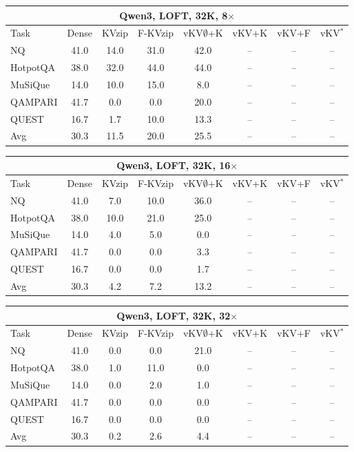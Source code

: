 \begin{tabular}{lccccccc}
\toprule
\multicolumn{8}{c}{Qwen3, LOFT, 32K, 8$\times$} \\
\midrule
Task & Dense & KVzip & F-KVzip & vKV$\emptyset$+K & vKV+K & vKV+F & vKV$^\ast$ \\
\midrule
NQ & 41.0 & 14.0 & 31.0 & 42.0 & -- & -- & -- \\
HotpotQA & 38.0 & 32.0 & 44.0 & 44.0 & -- & -- & -- \\
MuSiQue & 14.0 & 10.0 & 15.0 & 8.0 & -- & -- & -- \\
QAMPARI & 41.7 & 0.0 & 0.0 & 20.0 & -- & -- & -- \\
QUEST & 16.7 & 1.7 & 10.0 & 13.3 & -- & -- & -- \\
\midrule
Avg & 30.3 & 11.5 & 20.0 & 25.5 & -- & -- & -- \\
\bottomrule
\end{tabular}
\vspace{0.8em}

\begin{tabular}{lccccccc}
\toprule
\multicolumn{8}{c}{Qwen3, LOFT, 32K, 16$\times$} \\
\midrule
Task & Dense & KVzip & F-KVzip & vKV$\emptyset$+K & vKV+K & vKV+F & vKV$^\ast$ \\
\midrule
NQ & 41.0 & 7.0 & 10.0 & 36.0 & -- & -- & -- \\
HotpotQA & 38.0 & 10.0 & 21.0 & 25.0 & -- & -- & -- \\
MuSiQue & 14.0 & 4.0 & 5.0 & 0.0 & -- & -- & -- \\
QAMPARI & 41.7 & 0.0 & 0.0 & 3.3 & -- & -- & -- \\
QUEST & 16.7 & 0.0 & 0.0 & 1.7 & -- & -- & -- \\
\midrule
Avg & 30.3 & 4.2 & 7.2 & 13.2 & -- & -- & -- \\
\bottomrule
\end{tabular}
\vspace{0.8em}

\begin{tabular}{lccccccc}
\toprule
\multicolumn{8}{c}{Qwen3, LOFT, 32K, 32$\times$} \\
\midrule
Task & Dense & KVzip & F-KVzip & vKV$\emptyset$+K & vKV+K & vKV+F & vKV$^\ast$ \\
\midrule
NQ & 41.0 & 0.0 & 0.0 & 21.0 & -- & -- & -- \\
HotpotQA & 38.0 & 1.0 & 11.0 & 0.0 & -- & -- & -- \\
MuSiQue & 14.0 & 0.0 & 2.0 & 1.0 & -- & -- & -- \\
QAMPARI & 41.7 & 0.0 & 0.0 & 0.0 & -- & -- & -- \\
QUEST & 16.7 & 0.0 & 0.0 & 0.0 & -- & -- & -- \\
\midrule
Avg & 30.3 & 0.2 & 2.6 & 4.4 & -- & -- & -- \\
\bottomrule
\end{tabular}
\vspace{0.8em}

